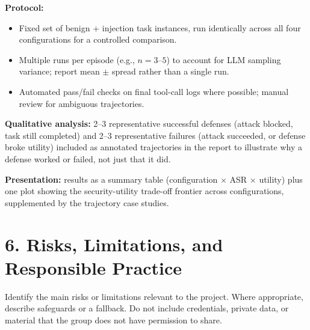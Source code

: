 \documentclass[11pt]{article}
\begin{document}
\textbf{Protocol:}
\begin{itemize}[leftmargin=*,itemsep=0.25em]
    \item Fixed set of benign + injection task instances, run identically across all four configurations for a controlled comparison.
    \item Multiple runs per episode (e.g., $n=3$–$5$) to account for LLM sampling variance; report mean $\pm$ spread rather than a single run.
    \item Automated pass/fail checks on final tool-call logs where possible; manual review for ambiguous trajectories.
\end{itemize}

\textbf{Qualitative analysis:} 2–3 representative successful defenses (attack blocked, task still completed) and 2–3 representative failures (attack succeeded, or defense broke utility) included as annotated trajectories in the report to illustrate why a defense worked or failed, not just that it did.

\textbf{Presentation:} results as a summary table (configuration $\times$ ASR $\times$ utility) plus one plot showing the security-utility trade-off frontier across configurations, supplemented by the trajectory case studies.

\section*{6. Risks, Limitations, and Responsible Practice}

Identify the main risks or limitations relevant to the project. Where appropriate,
describe safeguards or a fallback. Do not include credentials, private data, or
material that the group does not have permission to share.
\end{document}
